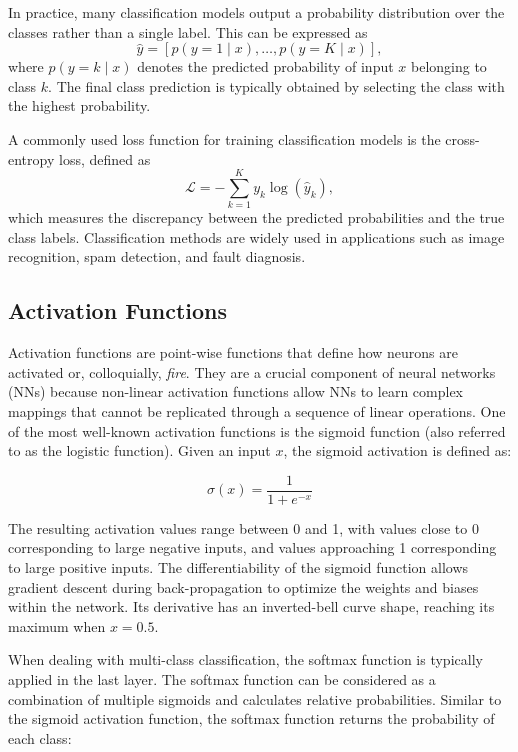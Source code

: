 In practice, many classification models output a probability distribution over the classes rather than a single label. This can be expressed as
\begin{equation}
\hat{y} = \left[ p(y = 1 \mid x), \dots, p(y = K \mid x) \right],
\end{equation}
where $p(y = k \mid x)$ denotes the predicted probability of input $x$ belonging to class $k$. The final class prediction is typically obtained by selecting the class with the highest probability.

A commonly used loss function for training classification models is the cross-entropy loss, defined as
\begin{equation}
\mathcal{L} = - \sum_{k=1}^{K} y_k \log \left( \hat{y}_k \right),
\end{equation}
which measures the discrepancy between the predicted probabilities and the true class labels. Classification methods are widely used in applications such as image recognition, spam detection, and fault diagnosis.    

\subsection{Activation Functions}

Activation functions are point-wise functions that define how neurons are activated or, colloquially, \textit{fire}. They are a crucial component of neural networks (NNs) because non-linear activation functions allow NNs to learn complex mappings that cannot be replicated through a sequence of linear operations. One of the most well-known activation functions is the sigmoid function (also referred to as the logistic function). Given an input $x$, the sigmoid activation is defined as:

\begin{equation}
\sigma(x) = \frac{1}{1 + e^{-x}}
\end{equation}

The resulting activation values range between 0 and 1, with values close to 0 corresponding to large negative inputs, and values approaching 1 corresponding to large positive inputs. The differentiability of the sigmoid function allows gradient descent during back-propagation to optimize the weights and biases within the network. Its derivative has an inverted-bell curve shape, reaching its maximum when $x = 0.5$.

When dealing with multi-class classification, the softmax function is typically applied in the last layer. The softmax function can be considered as a combination of multiple sigmoids and calculates relative probabilities. Similar to the sigmoid activation function, the softmax function returns the probability of each class:

